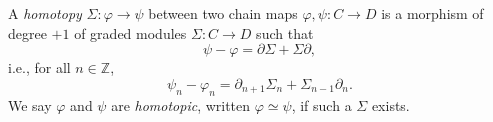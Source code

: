 A \textit{homotopy} $\Sigma : \varphi \to \psi$ between two chain maps $\varphi, \psi : C \to D$ is a morphism of degree $+1$ of graded modules $\Sigma : C \to D$ such that
$$\psi - \varphi = \partial \Sigma + \Sigma \partial,$$
i.e., for all $n \in \mathbb{Z}$,
$$\psi_n - \varphi_n = \partial_{n+1} \Sigma_n + \Sigma_{n-1} \partial_n.$$
We say $\varphi$ and $\psi$ are \textit{homotopic}, written $\varphi \simeq \psi$, if such a $\Sigma$ exists.